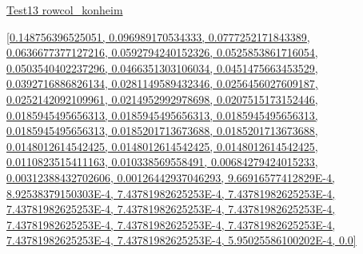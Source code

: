 \documentclass[12pt]{article}
\begin{document}
\noindent \url{Test13 rowcol_konheim}

\noindent \url{[0.148756396525051, 0.096989170534333, 0.0777252171843389, 0.0636677377127216, 0.0592794240152326, 0.0525853861716054, 0.0503540402237296, 0.0466351303106034, 0.0451475663453529, 0.0392716886826134, 0.0281149589432346, 0.0256456027609187, 0.0252142092109961, 0.0214952992978698, 0.0207515173152446, 0.0185945495656313, 0.0185945495656313, 0.0185945495656313, 0.0185945495656313, 0.0185201713673688, 0.0185201713673688, 0.0148012614542425, 0.0148012614542425, 0.0148012614542425, 0.0110823515411163, 0.010338569558491, 0.00684279424015233, 0.00312388432702606, 0.00126442937046293, 9.66916577412829E-4, 8.92538379150303E-4, 7.43781982625253E-4, 7.43781982625253E-4, 7.43781982625253E-4, 7.43781982625253E-4, 7.43781982625253E-4, 7.43781982625253E-4, 7.43781982625253E-4, 7.43781982625253E-4, 7.43781982625253E-4, 7.43781982625253E-4, 5.95025586100202E-4, 0.0]}
\end{document}
